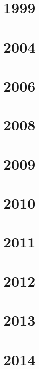 \section{1999}

\section{2004}

\section{2006}



\section{2008}


\section{2009}



\section{2010}


\section{2011}

\section{2012}

\section{2013}

\section{2014}

